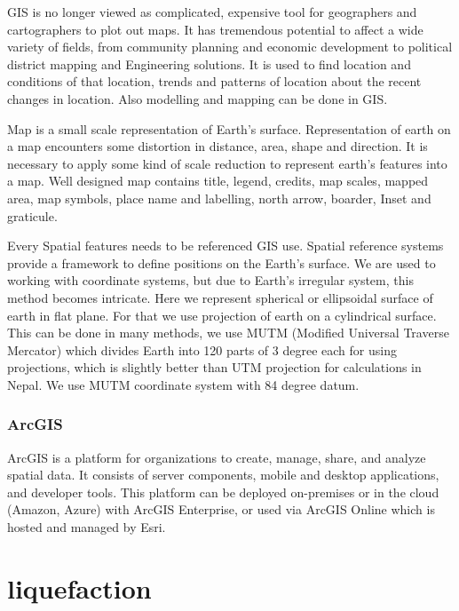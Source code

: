 GIS is no longer viewed as complicated, expensive tool for geographers and cartographers to plot out maps. It has tremendous potential to affect a wide variety of fields, from community planning and economic development to political district mapping and Engineering solutions. It is used to find location and conditions of that location, trends and patterns of location about the recent changes in location. Also modelling and mapping can be done in GIS.

Map is a small scale representation of Earth’s surface. Representation of earth on a map encounters some distortion in distance, area, shape and direction. It is necessary to apply some kind of scale reduction to represent earth’s features into a map. Well designed map contains title, legend, credits, map scales, mapped area, map symbols, place name and labelling, north arrow, boarder, Inset and graticule.

Every Spatial features needs to be referenced GIS use. Spatial reference systems provide a framework to define positions on the Earth’s surface. We are used to working with coordinate systems, but due to Earth’s irregular system, this method becomes intricate. Here we represent spherical or ellipsoidal surface of earth in flat plane. For that we use projection of earth on a cylindrical surface. This can be done in many methods, we use MUTM (Modified Universal Traverse Mercator) which divides Earth into 120 parts of 3 degree each for using projections, which is slightly better than UTM projection for calculations in Nepal. We use MUTM coordinate system with 84 degree datum.

\subsubsection{ArcGIS}
ArcGIS is a platform for organizations to create, manage, share, and analyze spatial data. It consists of server components, mobile and desktop applications, and developer tools. This platform can be deployed on-premises or in the cloud (Amazon, Azure) with ArcGIS Enterprise, or used via ArcGIS Online which is hosted and managed by Esri.
\section{liquefaction}
